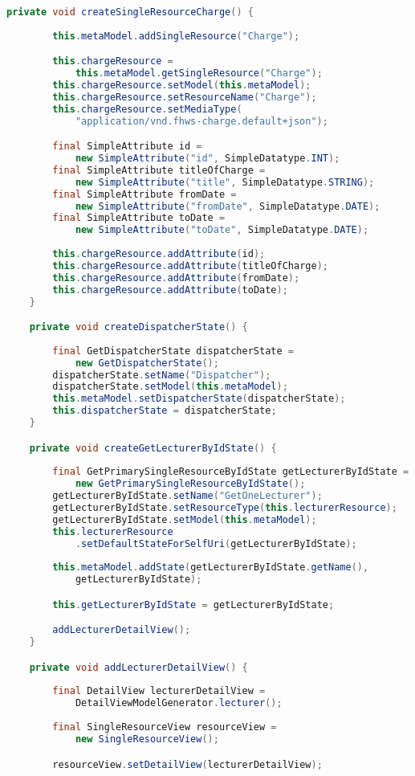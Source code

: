 \begin{lstlisting}[label=lst:enfield_model,
language=java,
firstnumber=1,
caption=Beschreibung des \textit{Enfield-Modell} der Referenzimplementierung. ]
	private void createSingleResourceCharge() {
	
		this.metaModel.addSingleResource("Charge");

		this.chargeResource =
			this.metaModel.getSingleResource("Charge");
		this.chargeResource.setModel(this.metaModel);
		this.chargeResource.setResourceName("Charge");
		this.chargeResource.setMediaType(
			"application/vnd.fhws-charge.default+json");

		final SimpleAttribute id = 
			new SimpleAttribute("id", SimpleDatatype.INT);
		final SimpleAttribute titleOfCharge = 
			new SimpleAttribute("title", SimpleDatatype.STRING);
		final SimpleAttribute fromDate = 
			new SimpleAttribute("fromDate", SimpleDatatype.DATE);
		final SimpleAttribute toDate = 
			new SimpleAttribute("toDate", SimpleDatatype.DATE);
	
		this.chargeResource.addAttribute(id);
		this.chargeResource.addAttribute(titleOfCharge);
		this.chargeResource.addAttribute(fromDate);
		this.chargeResource.addAttribute(toDate);
	}

	private void createDispatcherState() {
	
		final GetDispatcherState dispatcherState = 
			new GetDispatcherState();
		dispatcherState.setName("Dispatcher");
		dispatcherState.setModel(this.metaModel);
		this.metaModel.setDispatcherState(dispatcherState);
		this.dispatcherState = dispatcherState;
	}

	private void createGetLecturerByIdState() {
	
		final GetPrimarySingleResourceByIdState getLecturerByIdState = 
			new GetPrimarySingleResourceByIdState();
		getLecturerByIdState.setName("GetOneLecturer");
		getLecturerByIdState.setResourceType(this.lecturerResource);
		getLecturerByIdState.setModel(this.metaModel);
		this.lecturerResource
			.setDefaultStateForSelfUri(getLecturerByIdState);
		
		this.metaModel.addState(getLecturerByIdState.getName(),
			getLecturerByIdState);

		this.getLecturerByIdState = getLecturerByIdState;

		addLecturerDetailView();
	}

	private void addLecturerDetailView() {
	
		final DetailView lecturerDetailView = 
			DetailViewModelGenerator.lecturer();
	
		final SingleResourceView resourceView = 
			new SingleResourceView();

		resourceView.setDetailView(lecturerDetailView);


\end{lstlisting}
